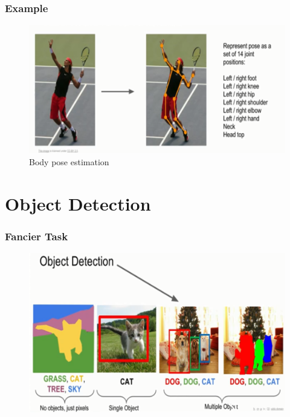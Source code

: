 \documentclass{beamer}
\begin{document}
\begin{frame}
	\frametitle{Example}
	
	\begin{figure}
		\includegraphics[width=\linewidth]{Pics/humanpose.PNG}
		\caption{Body pose estimation}
	\end{figure}
	
\section{Object Detection}
\end{frame}
\begin{frame}
	\frametitle{Fancier Task}
	
	\begin{figure}
		\includegraphics[width=\linewidth]{Pics/detect1.PNG}
		
	\end{figure}
	
\end{frame}
\end{document}

